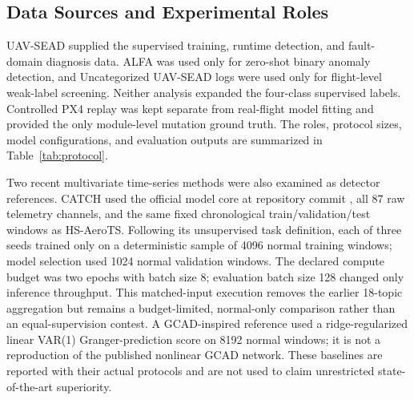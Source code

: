 \subsection{Data Sources and Experimental Roles}

UAV-SEAD supplied the supervised training, runtime detection, and fault-domain diagnosis data. ALFA was used only for zero-shot binary anomaly detection, and Uncategorized UAV-SEAD logs were used only for flight-level weak-label screening. Neither analysis expanded the four-class supervised labels. Controlled PX4 replay was kept separate from real-flight model fitting and provided the only module-level mutation ground truth. The roles, protocol sizes, model configurations, and evaluation outputs are summarized in Table~\ref{tab:protocol}.

Two recent multivariate time-series methods were also examined as detector references. CATCH \cite{wu2025catch} used the official model core at repository commit \texttt{}, all 87 raw telemetry channels, and the same fixed chronological train/validation/test windows as HS-AeroTS. Following its unsupervised task definition, each of three seeds trained only on a deterministic sample of 4096 normal training windows; model selection used 1024 normal validation windows. The declared compute budget was two epochs with batch size 8; evaluation batch size 128 changed only inference throughput. This matched-input execution removes the earlier 18-topic aggregation but remains a budget-limited, normal-only comparison rather than an equal-supervision contest. A GCAD-inspired reference \cite{liu2025gcad} used a ridge-regularized linear VAR(1) Granger-prediction score on 8192 normal windows; it is not a reproduction of the published nonlinear GCAD network. These baselines are reported with their actual protocols and are not used to claim unrestricted state-of-the-art superiority.
